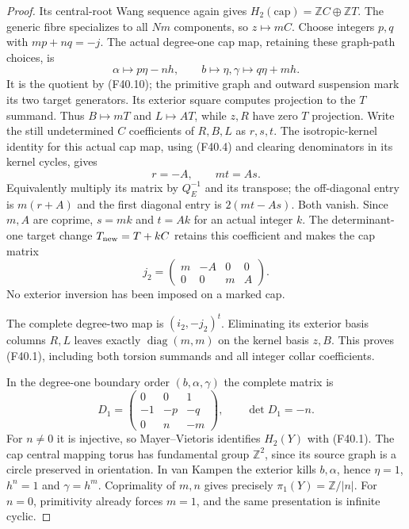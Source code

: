 \begin{proof}
Its central-root Wang sequence again gives
$H_2(\mathrm{cap})=\mathbb ZC\oplus\mathbb ZT$.
The generic fibre specializes to all $Nm$ components, so
$z\mapsto mC$. Choose integers $p,q$ with $mp+nq=-j$.
The actual degree-one cap map, retaining these graph-path
choices, is
\[
 \alpha\mapsto p\eta-nh,\qquad b\mapsto\eta,
                    \gamma\mapsto q\eta+mh.           \tag{F40.11}
\]
It is the quotient by (F40.10); the primitive graph and outward
suspension mark its two target generators. Its exterior square
computes projection to the $T$ summand. Thus $B\mapsto mT$
and $L\mapsto AT$, while $z,R$ have zero $T$ projection.
Write the still undetermined $C$ coefficients of $R,B,L$
as $r,s,t$. The isotropic-kernel identity for this actual cap
map, using (F40.4) and clearing denominators in its kernel
cycles, gives
\[
                         r=-A,\qquad mt=As.            \tag{F40.12}
\]
Equivalently multiply its matrix by $Q_E^{-1}$ and its transpose;
the off-diagonal entry is $m(r+A)$ and the first diagonal
entry is $2(mt-As)$. Both vanish. Since $m,A$ are coprime,
$s=mk$ and $t=Ak$ for an actual integer $k$. The determinant-one
target change $T_{\rm new}=T+kC$ retains this coefficient and
makes the cap matrix
\[
                 j_2=\begin{pmatrix}m&-A&0&0\\0&0&m&A\end{pmatrix}.
                                                               \tag{F40.13}
\]
No exterior inversion has been imposed on a marked cap.

The complete degree-two map is $(i_2,-j_2)^t$.
Eliminating its exterior basis columns $R,L$ leaves exactly
$\operatorname{diag}(m,m)$ on the kernel basis $z,B$.
This proves (F40.1), including both torsion summands and all
integer collar coefficients.

In the degree-one boundary order $(b,\alpha,\gamma)$ the
complete matrix is
\[
 D_1=\begin{pmatrix}0&0&1\\-1&-p&-q\\0&n&-m\end{pmatrix},
                         \qquad\det D_1=-n.            \tag{F40.14}
\]
For $n\ne0$ it is injective, so Mayer--Vietoris identifies
$H_2(Y)$ with (F40.1). The cap central mapping torus has
fundamental group $\mathbb Z^2$, since its source graph is
a circle preserved in orientation. In van Kampen the exterior
kills $b,\alpha$, hence $\eta=1$, $h^n=1$ and
$\gamma=h^m$. Coprimality of $m,n$ gives precisely
$\pi_1(Y)=\mathbb Z/|n|$. For $n=0$, primitivity already
forces $m=1$, and the same presentation is infinite cyclic.


\end{proof}
